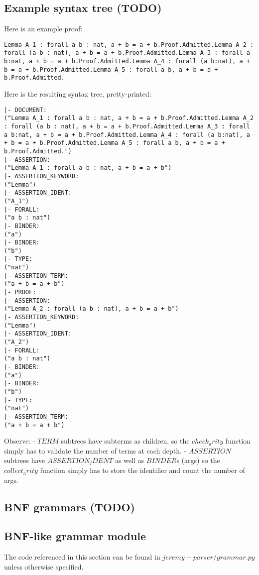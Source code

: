 \subsection{Example syntax tree  (TODO)}

Here is an example proof:
\begin{lstlisting}
Lemma A_1 : forall a b : nat, a + b = a + b.Proof.Admitted.Lemma A_2 : forall (a b : nat), a + b = a + b.Proof.Admitted.Lemma A_3 : forall a b:nat, a + b = a + b.Proof.Admitted.Lemma A_4 : forall (a b:nat), a + b = a + b.Proof.Admitted.Lemma A_5 : forall a b, a + b = a + b.Proof.Admitted.
\end{lstlisting}
Here is the resulting syntax tree, pretty-printed:
\begin{lstlisting}
|- DOCUMENT:
("Lemma A_1 : forall a b : nat, a + b = a + b.Proof.Admitted.Lemma A_2 : forall (a b : nat), a + b = a + b.Proof.Admitted.Lemma A_3 : forall a b:nat, a + b = a + b.Proof.Admitted.Lemma A_4 : forall (a b:nat), a + b = a + b.Proof.Admitted.Lemma A_5 : forall a b, a + b = a + b.Proof.Admitted.")
|- ASSERTION:
("Lemma A_1 : forall a b : nat, a + b = a + b")
|- ASSERTION_KEYWORD:
("Lemma")
|- ASSERTION_IDENT:
("A_1")
|- FORALL:
("a b : nat")
|- BINDER:
("a")
|- BINDER:
("b")
|- TYPE:
("nat")
|- ASSERTION_TERM:
("a + b = a + b")
|- PROOF:
|- ASSERTION:
("Lemma A_2 : forall (a b : nat), a + b = a + b")
|- ASSERTION_KEYWORD:
("Lemma")
|- ASSERTION_IDENT:
("A_2")
|- FORALL:
("a b : nat")
|- BINDER:
("a")
|- BINDER:
("b")
|- TYPE:
("nat")
|- ASSERTION_TERM:
("a + b = a + b")
\end{lstlisting}
Observe:
- $TERM$ subtrees have subterms as children, so the $check_arity$ function simply has to validate the number of terms at each depth.
- $ASSERTION$ subtrees have $ASSERTION_IDENT$ as well as $BINDER$s (args) so the $collect_arity$ function simply has to store the identifier and count the number of args.

\subsection{BNF grammars  (TODO)}

\subsection{BNF-like grammar module}


The code referenced in this section can be found in $jeremy-parser/grammar.py$ unless otherwise specified.

